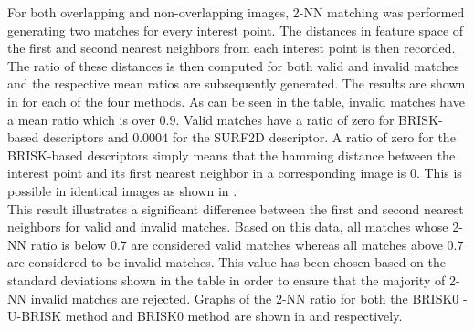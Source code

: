 \documentclass{report}
\begin{document}
For both overlapping and non-overlapping images, 2-NN matching was performed generating two matches for every interest point. The distances in feature space of the first and second nearest neighbors from each interest point is then recorded. The ratio of these distances is then computed for both valid and invalid matches and the respective mean ratios are subsequently generated. The results are shown in  for each of the four methods. As can be seen in the table, invalid matches have a mean ratio which is over $0.9$. Valid matches have a ratio of zero for BRISK-based descriptors and $0.0004$ for the SURF2D descriptor. A ratio of zero for the BRISK-based descriptors simply means that the hamming distance between the interest point and its first nearest neighbor in a corresponding image is $0$. This is possible in identical images as shown in .\\ 

This result illustrates a significant difference between the first and second nearest neighbors for valid and invalid matches. Based on this data, all matches whose 2-NN ratio is below $0.7$ are considered valid matches whereas all matches above $0.7$ are considered to be invalid matches. This value has been chosen based on the standard deviations shown in the table in order to ensure that the majority of 2-NN invalid matches are rejected. Graphs of the 2-NN ratio for both the BRISK0 - U-BRISK method and BRISK0 method are shown in  and  respectively. \\
\end{document}
